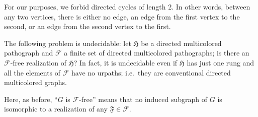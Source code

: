 \documentclass{article}
\newcommand{\Fc}{\mathcal{F}}
\newcommand{\Ff}{\mathfrak{F}}
\newcommand{\Hf}{\mathfrak{H}}
\begin{document}
For our purposes, we forbid directed cycles of length 2. In other words, between any two vertices, there is either no edge, an edge from the first vertex to the second, or an edge from the second vertex to the first.

\begin{lemma}\label{lem:dicolor}
The following problem is undecidable: let $\Hf$ be a directed multicolored pathograph and $\Fc$ a finite set of directed multicolored pathographs; is there an $\Fc$-free realization of $\Hf$? In fact, it is undecidable even if $\Hf$ has just one rung and all the elements of $\Fc$ have no urpaths; i.e.\ they are conventional directed multicolored graphs.
\end{lemma}
Here, as before, ``$G$ is $\Fc$-free'' means that no induced subgraph of $G$ is isomorphic to a realization of any $\Ff\in \Fc$.
\end{document}

